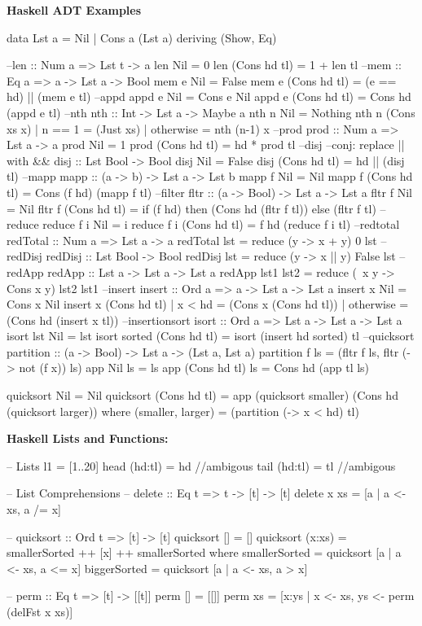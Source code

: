 \begin{breakbox}
\textbf{Haskell ADT Examples}
\begin{haskellcode}
data Lst a = Nil | Cons a (Lst a) deriving (Show, Eq)

--len :: Num a => Lst t -> a
len Nil = 0
len (Cons hd tl) = 1 + len tl
--mem :: Eq a => a -> Lst a -> Bool
mem e Nil = False
mem e (Cons hd tl) = (e == hd) || (mem e tl)
--appd
appd e Nil = Cons e Nil
appd e (Cons hd tl) = Cons hd (appd e tl)
--nth
nth :: Int -> Lst a -> Maybe a
nth n Nil = Nothing
nth n (Cons xs x) | n == 1 = (Just xs)
                  | otherwise = nth (n-1) x
--prod
prod :: Num a => Lst a -> a
prod Nil = 1
prod (Cons hd tl) = hd * prod tl
--disj --conj: replace || with &&
disj :: Lst Bool -> Bool
disj Nil = False
disj (Cons hd tl) = hd || (disj tl)
--mapp
mapp :: (a -> b) -> Lst a -> Lst b
mapp f Nil = Nil
mapp f (Cons hd tl) = Cons (f hd) (mapp f tl)
--filter
fltr :: (a -> Bool) -> Lst a -> Lst a
fltr f Nil = Nil
fltr f (Cons hd tl) = if (f hd) then 
			(Cons hd (fltr f tl)) else (fltr f tl)
--reduce 
reduce f i Nil = i
reduce f i (Cons hd tl) = f hd (reduce f i tl)
--redtotal
redTotal :: Num a => Lst a -> a
redTotal lst = reduce (\x y -> x + y) 0 lst
--redDisj
redDisj :: Lst Bool -> Bool
redDisj lst = reduce (\x y -> x || y) False lst
--redApp
redApp :: Lst a -> Lst a -> Lst a
redApp lst1 lst2 = reduce (\ x y -> Cons x y) lst2 lst1
--insert
insert :: Ord a => a -> Lst a -> Lst a
insert x Nil = Cons x Nil
insert x (Cons hd tl) | x < hd = (Cons x (Cons hd tl))
                      | otherwise = (Cons hd (insert x tl))
--insertionsort
isort :: Ord a => Lst a -> Lst a -> Lst a
isort lst Nil = lst
isort sorted (Cons hd tl) = isort (insert hd sorted) tl
--quicksort
partition :: (a -> Bool) -> Lst a -> (Lst a, Lst a)
partition f ls = (fltr f ls, fltr (\x -> not (f x)) ls)
app Nil ls = ls
app (Cons hd tl) ls = Cons hd (app tl ls)

quicksort Nil = Nil
quicksort (Cons hd tl) = app (quicksort smaller) 
			(Cons hd (quicksort larger))
  where
    (smaller, larger) = (partition (\x -> x < hd) tl)
\end{haskellcode}
\end{breakbox}

\begin{breakbox}
\textbf{Haskell Lists and Functions:}\\
\begin{haskellcode}
-- Lists
l1 = [1..20]
head (hd:tl) = hd //ambigous
tail (hd:tl) = tl //ambigous
	
-- List Comprehensions
-- delete :: Eq t => t -> [t] -> [t]
delete x xs = [a | a <- xs, a /= x]
 
-- quicksort :: Ord t => [t] -> [t]
quicksort [] = []  
quicksort (x:xs) = smallerSorted ++ [x] ++ smallerSorted
	where
		smallerSorted = quicksort [a | a <- xs, a <= x]
		biggerSorted = quicksort [a | a <- xs, a > x]

-- perm :: Eq t => [t] -> [[t]]
perm [] = [[]]
perm xs = [x:ys | x <- xs, ys <- perm (delFst x xs)]
\end{haskellcode}
\end{breakbox}

